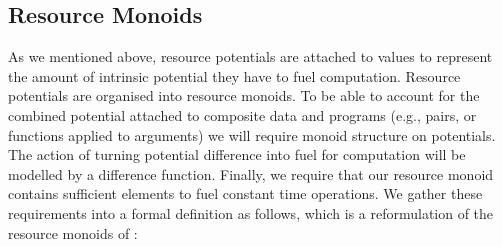 \documentclass[acmsmall,review,screen,anonymous]{acmart}
\begin{document}
\subsection{Resource Monoids}
\label{sec:resource-monoids}

As we mentioned above, resource potentials are attached to values to
represent the amount of intrinsic potential they have to fuel
computation. Resource potentials are organised into resource
monoids. To be able to account for the combined potential attached to
composite data and programs (e.g., pairs, or functions applied to
arguments) we will require monoid structure on potentials. The action
of turning potential difference into fuel for computation will be
modelled by a difference function. Finally, we require that our
resource monoid contains sufficient elements to fuel constant time
operations. We gather these requirements into a formal definition as
follows, which is a reformulation of the resource monoids of
\cite{hoffman-dallago}:
\end{document}
